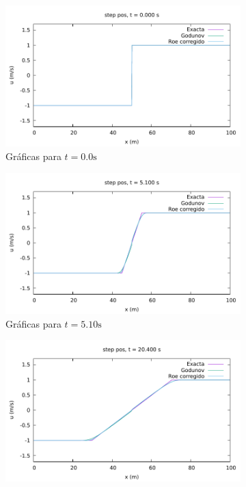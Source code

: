 \documentclass[12pt]{article}
\begin{document}
	\begin{figure}[h]
		\centering
		\begin{subfigure}[b]{0.4\textwidth}
			\includegraphics[width=\textwidth]{../burgers1DVF/results/sol_fijas/step_pos-roe-fix/000.pdf}
			\caption*{Gráficas para $t=0.0\unit{\second}$}
		\end{subfigure}
		\hfill
		\begin{subfigure}[b]{0.4\textwidth}
			\includegraphics[width=\textwidth]{../burgers1DVF/results/sol_fijas/step_pos-roe-fix/170.pdf}
			\caption*{Gráficas para $t=5.10\unit{\second}$}
		\end{subfigure}
		\par\medskip
		\begin{subfigure}[b]{0.4\textwidth}
			\includegraphics[width=\textwidth]{../burgers1DVF/results/sol_fijas/step_pos-roe-fix/680.pdf}

\end{subfigure}
\end{figure}
\end{document}
